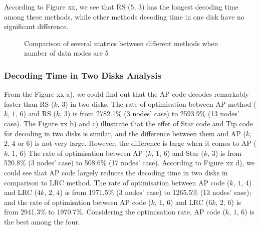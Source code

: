 \documentclass[sigconf]{acmart}
\begin{document}
According to Figure xx, we see that RS ($5$, $3$) has the longest decoding time among these methods, while other methods decoding time in one disk have no significant difference.\par


\begin{figure}[]
\caption{Comparison of several matrics between different methods when number of data nodes are 5}\label{fig-BAR}
\end{figure}


\subsubsection{Decoding Time in Two Disks Analysis}
From the Figure xx a), we could find out that the AP code decodes remarkably faster than RS ($k$, $3$) in two disks. The rate of optimisation between AP method ($k$, $1$, $6$) and RS ($k$, $3$) is from 2782.1\% (3 nodes’ case) to 2593.9\% (13 nodes’ case). The Figure xx b) and c) illustrate that the effet of Star code and Tip code for decoding in two disks is similar, and the difference between them and AP ($k$, $2$, $4$ or $6$) is not very large. However, the difference is large when it comes to AP ($k$, $1$, $6$) The rate of optimisation between AP ($k$, $1$, $6$) and Star ($k$, $3$) is from 520.8\% (3 nodes’ case) to 508.6\% (17 nodes’ case). According to Figure xx d), we could see that AP code largely reduces the decoding time in two disks in comparison to LRC method. The rate of optimisation between AP code ($k$, $1$, $4$) and LRC ($4k$, $2$, $4$) is from 1971.5\% (3 nodes’ case) to 1265.5\% (13 nodes’ case); and the rate of optimisation between AP code ($k$, $1$, $6$) and LRC ($6k$, $2$, $6$) is from 2941.3\% to 1970.7\%. Considering the optimisation rate, AP code ($k$, $1$, $6$) is the best among the four.\par
\end{document}

